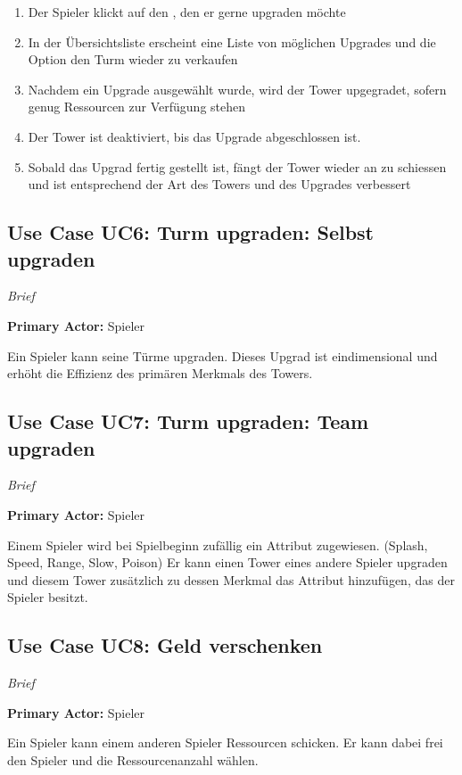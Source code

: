 \begin{enumerate}
\item Der Spieler klickt auf den , den er gerne upgraden möchte
\item In der Übersichtsliste erscheint eine Liste von möglichen Upgrades und die Option den Turm wieder zu verkaufen
\item Nachdem ein Upgrade ausgewählt wurde, wird der Tower upgegradet, sofern genug Ressourcen zur Verfügung stehen
\item Der Tower ist deaktiviert, bis das Upgrade abgeschlossen ist.
\item Sobald das Upgrad fertig gestellt ist, fängt der Tower wieder an zu schiessen und ist entsprechend der Art des Towers und des Upgrades verbessert
\end{enumerate}




\subsection{Use Case UC6: Turm upgraden: Selbst upgraden}
\textit{Brief}

\textbf{Primary Actor:} Spieler

Ein Spieler kann seine Türme upgraden. Dieses Upgrad ist eindimensional und erhöht die Effizienz des primären Merkmals des Towers.




\subsection{Use Case UC7: Turm upgraden: Team upgraden}
\textit{Brief}

\textbf{Primary Actor:} Spieler

Einem Spieler wird bei Spielbeginn zufällig ein Attribut zugewiesen. (Splash, Speed, Range, Slow, Poison)
Er kann einen Tower eines andere Spieler upgraden und diesem Tower zusätzlich zu dessen Merkmal das Attribut hinzufügen, das der Spieler besitzt. 





\subsection{Use Case UC8: Geld verschenken}
\textit{Brief}

\textbf{Primary Actor:} Spieler

Ein Spieler kann einem anderen Spieler Ressourcen schicken. Er kann dabei frei den Spieler und die Ressourcenanzahl wählen.




